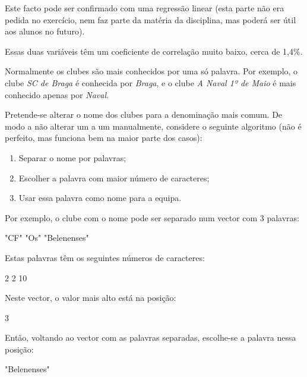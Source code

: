 \documentclass{exam}
\begin{document}
\begin{questions}
\begin{solution}
	Este facto pode ser confirmado com uma regressão linear (esta parte não era pedida no exercício, nem faz parte da matéria da disciplina, mas poderá ser útil aos alunos no futuro).
	
	Essas duas variáveis têm um coeficiente de correlação muito baixo, cerca de 1,4\%.
	
\end{solution}

\question Normalmente os clubes são mais conhecidos por uma só palavra. Por exemplo, o clube \textit{SC de Braga} é conhecida por \textit{Braga}, e o clube \textit{A Naval 1º de Maio} é mais conhecido apenas por \textit{Naval}.

Pretende-se alterar o nome dos clubes  para a denominação mais comum. De modo a não alterar um a um manualmente, considere o seguinte algoritmo (não é perfeito, mas funciona bem na maior parte dos casos):

\begin{enumerate}
	\item Separar o nome por palavras;
	\item Escolher a palavra com maior número de caracteres;
	\item Usar essa palavra como nome para a equipa.
\end{enumerate}

Por exemplo, o clube com o nome  pode ser separado num vector com 3 palavras:

\begin{rcode}
	[1] "CF"         "Os"         "Belenenses"
\end{rcode}

Estas palavras têm os seguintes números de caracteres:

\begin{rcode}
	[1]  2  2 10
\end{rcode}

Neste vector, o valor mais alto está na posição:

\begin{rcode}
	[1] 3
\end{rcode}

Então, voltando ao vector com as palavras separadas, escolhe-se a palavra nessa posição:

\begin{rcode}
	[1] "Belenenses"
\end{rcode}	


\end{questions}
\end{document}
